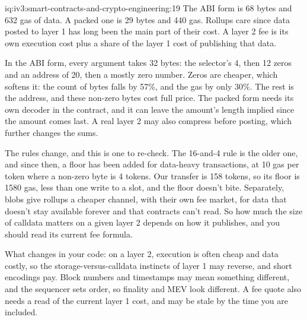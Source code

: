 \begin{solution}{iq:iv3:smart-contracts-and-crypto-engineering:19}
The ABI form is 68 bytes and 632 gas of data. A packed one is 29 bytes and 440 gas. Rollups care since data posted to layer 1 has long been the main part of their cost. A layer 2 fee is its own execution cost plus a share of the layer 1 cost of publishing that data.
\enlargethispage{-3\baselineskip}%
\label{lst:iv3:cr:calldata}

In the ABI form, every argument takes 32 bytes: the selector's 4, then 12 zeros and an address of 20, then a mostly zero number. Zeros are cheaper, which softens it: the count of bytes falls by 57\%, and the gas by only 30\%. The rest is the address, and these non-zero bytes cost full price. The packed form needs its own decoder in the contract, and it can leave the amount's length implied since the amount comes last. A real layer 2 may also compress before posting, which further changes the sums.

The rules change, and this is one to re-check. The 16-and-4 rule is the older one, and since then, a floor has been added for data-heavy transactions, at 10 gas per token where a non-zero byte is 4 tokens. Our transfer is 158 tokens, so its floor is 1580 gas, less than one write to a slot, and the floor doesn't bite. Separately, blobs give rollups a cheaper channel, with their own fee market, for data that doesn't stay available forever and that contracts can't read. So how much the size of calldata matters on a given layer 2 depends on how it publishes, and you should read its current fee formula.

What changes in your code: on a layer 2, execution is often cheap and data costly, so the storage-versus-calldata instincts of layer 1 may reverse, and short encodings pay. Block numbers and timestamps may mean something different, and the sequencer sets order, so finality and MEV look different. A fee quote also needs a read of the current layer 1 cost, and may be stale by the time you are included.

\end{solution}

